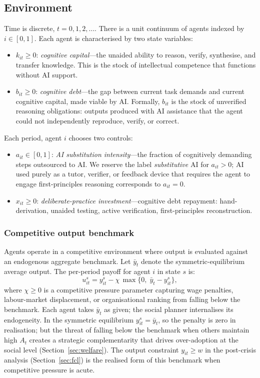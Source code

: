 \documentclass[12pt]{article}
\begin{document}
\subsection{Environment}

Time is discrete, $t = 0, 1, 2, \ldots$\;.
There is a unit continuum of agents indexed by $i \in [0,1]$.
Each agent is characterised by two state variables:
\begin{itemize}
\item $k_{it} \geq 0$: \emph{cognitive capital}---the unaided ability to reason,
verify, synthesise, and transfer knowledge. This is the stock of intellectual
competence that functions without AI support.
\item $b_{it} \geq 0$: \emph{cognitive debt}---the gap between current task demands
and current cognitive capital, made viable by AI. Formally, $b_{it}$ is the stock of
unverified reasoning obligations: outputs produced with AI assistance that the agent
could not independently reproduce, verify, or correct.
\end{itemize}
Each period, agent $i$ chooses two controls:
\begin{itemize}
\item $a_{it} \in [0,1]$: \emph{AI substitution intensity}---the fraction of
cognitively demanding steps outsourced to AI. We reserve the label \emph{substitutive}
AI for $a_{it} > 0$; AI used purely as a tutor, verifier, or feedback device that
requires the agent to engage first-principles reasoning corresponds to $a_{it} = 0$.
\item $x_{it} \geq 0$: \emph{deliberate-practice investment}---cognitive debt
repayment: hand-derivation, unaided testing, active verification, first-principles
reconstruction.
\end{itemize}

\subsubsection*{Competitive output benchmark}

Agents operate in a competitive environment where output is evaluated against an
endogenous aggregate benchmark. Let $\bar{y}_t$ denote the symmetric-equilibrium
average output. The per-period payoff for agent $i$ in state $s$ is:
\begin{equation}
u_{it}^s = y_{it}^s - \chi\,\max\bigl\{0,\; \bar{y}_t - y_{it}^s\bigr\},
\label{eq:benchmark}
\end{equation}
where $\chi \geq 0$ is a competitive pressure parameter capturing wage penalties,
labour-market displacement, or organisational ranking from falling below the
benchmark. Each agent takes $\bar{y}_t$ as given; the social planner internalises
its endogeneity. In the symmetric equilibrium $y_{it}^s = \bar{y}_t$, so the
penalty is zero in realisation; but the threat of falling below the benchmark when
others maintain high $A_t$ creates a strategic complementarity that drives
over-adoption at the social level (Section~\ref{sec:welfare}). The output constraint
$y_{it} \geq w$ in the post-crisis analysis (Section~\ref{sec:fcl}) is the
realised form of this benchmark when competitive pressure is acute.
\end{document}
